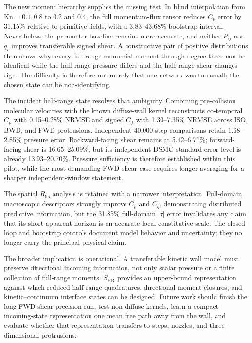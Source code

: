 \documentclass[aip,pof,preprint,notitlepage,floatfix,amsmath,amssymb]{revtex4-2}
\newcommand{\Kn}{\mathrm{Kn}}
\begin{document}
The new moment hierarchy supplies the missing test. In blind interpolation from $\Kn=0.1,0.8$ to 0.2 and 0.4, the full momentum-flux tensor reduces $C_p$ error by 31.15\% relative to primitive fields, with a 3.83--43.68\% bootstrap interval. Nevertheless, the parameter baseline remains more accurate, and neither $P_{ij}$ nor $q_i$ improves transferable signed shear. A constructive pair of positive distributions then shows why: every full-range monomial moment through degree three can be identical while the half-range pressure differs and the half-range shear changes sign. The difficulty is therefore not merely that one network was too small; the chosen state can be non-identifying.

The incident half-range state resolves that ambiguity. Combining pre-collision molecular velocities with the known diffuse-wall kernel reconstructs co-temporal $C_p$ with 0.15--0.28\% NRMSE and signed $C_f$ with 1.30--7.35\% NRMSE across ISO, BWD, and FWD protrusions. Independent 40,000-step comparisons retain 1.68--2.85\% pressure error. Backward-facing shear remains at 5.42--6.77\%; forward-facing shear is 16.65--25.09\%, but its independent DSMC standard-error level is already 13.93--20.70\%. Pressure sufficiency is therefore established within this pilot, while the most demanding FWD shear case requires longer averaging for a sharper independent-window statement.

The spatial $R_{95}$ analysis is retained with a narrower interpretation. Full-domain macroscopic descriptors strongly improve $C_p$ and $C_q$, demonstrating distributed predictive information, but the 31.85\% full-domain $|\tau|$ error invalidates any claim that its short apparent horizon is an accurate local constitutive scale. The closed-loop and bootstrap controls document model behavior and uncertainty; they no longer carry the principal physical claim.

The broader implication is operational. A transferable kinetic wall model must preserve directional incoming information, not only scalar pressure or a finite collection of full-range moments. $S_{\mathrm{HR}}$ provides an upper-bound representation against which reduced half-range quadratures, directional-moment closures, and kinetic--continuum interface states can be designed. Future work should finish the long FWD shear precision run, test non-diffuse kernels, learn a compact incoming-state representation one mean free path away from the wall, and evaluate whether that representation transfers to steps, nozzles, and three-dimensional protrusions.
\end{document}
